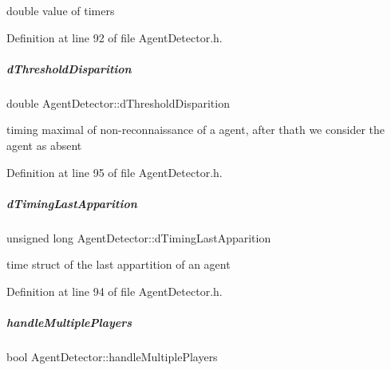 double value of timers 



Definition at line 92 of file Agent\+Detector.\+h.

\mbox{\label{group__agentDetector_a43e5c578387b472710786a5665d8244e}} 
\subparagraph{\texorpdfstring{d\+Threshold\+Disparition}{dThresholdDisparition}}
{\footnotesize\ttfamily double Agent\+Detector\+::d\+Threshold\+Disparition\hspace{0.3cm}{\ttfamily [protected]}}



timing maximal of non-\/reconnaissance of a agent, after thath we consider the agent as absent 



Definition at line 95 of file Agent\+Detector.\+h.

\mbox{\label{group__agentDetector_ad9ac37b9a9ba8db75e99aec3aa6cdecd}} 
\subparagraph{\texorpdfstring{d\+Timing\+Last\+Apparition}{dTimingLastApparition}}
{\footnotesize\ttfamily unsigned long Agent\+Detector\+::d\+Timing\+Last\+Apparition\hspace{0.3cm}{\ttfamily [protected]}}



time struct of the last appartition of an agent 



Definition at line 94 of file Agent\+Detector.\+h.

\mbox{\label{group__agentDetector_a6c6335e325d46e248b870f902af0f276}} 
\subparagraph{\texorpdfstring{handle\+Multiple\+Players}{handleMultiplePlayers}}
{\footnotesize\ttfamily bool Agent\+Detector\+::handle\+Multiple\+Players\hspace{0.3cm}{\ttfamily [protected]}}



